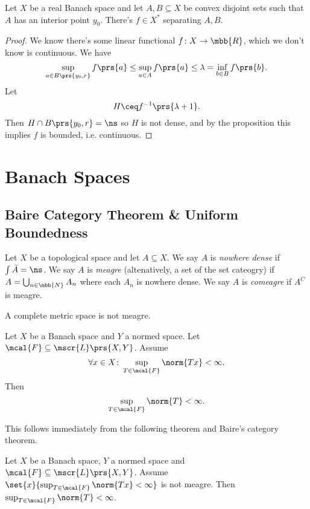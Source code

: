\documentclass[10pt, twoside]{book}
\begin{document}
\begin{corollary}
Let $X$ be a real Banach space and let $A,B \subseteq X$ be convex disjoint sets such that $A$ has an interior point $y_0$.
There's $f \in X^*$ separating $A,B$.
\end{corollary}

\begin{proof}
We know there's some linear functional $f \colon X \to \mbb{R}$, which we don't know is continuous.
We have
\[\sup_{a \in B\prs{y_0, r}} f\prs{a} \leq \sup_{a \in A} f\prs{a} \leq \lambda = \inf_{b \in B} f\prs{b} \text{.}\]
Let
\[H \ceq f^{-1}\prs{\lambda + 1} \text{.}\]
Then $H \cap B\prs{y_0, r} = \ns$ so $H$ is not dense, and by the proposition this implies $f$ is bounded, i.e. continuous.
\end{proof}

\section{Banach Spaces}

\subsection{Baire Category Theorem \& Uniform Boundedness}

\begin{definition}
Let $X$ be a topological space and let $A \subseteq X$.
We say $A$ is \emph{nowhere dense} if $\int \bar{A} = \ns$.
We say $A$ is \emph{meagre} (altenatively, a set of the set cateogry) if $A = \bigcup_{n \in \mbb{N}} A_n$ where each $A_n$ is nowhere dense.
We say $A$ is \emph{comeagre} if $A^C$ is meagre.
\end{definition}

\begin{theorem}[Baire]
A complete metric space is not meagre.
\end{theorem}

\begin{theorem}
Let $X$ be a Banach space and $Y$ a normed space. Let $\mcal{F} \subseteq \mscr{L}\prs{X,Y}$.
Assume
\[\forall x \in X \colon \sup_{T \in \mcal{F}} \norm{Tx} < \infty \text{.}\]
Then
\[\sup_{T \in \mcal{F}} \norm{T} < \infty \text{.}\]
\end{theorem}

This follows immediately from the following theorem and Baire's category theorem.

\begin{theorem}
Let $X$ be a Banach space, $Y$ a normed space and $\mcal{F} \subseteq \mscr{L}\prs{X,Y}$. Assume $\set{x}{\sup_{T \in \mcal{F}} \norm{T x} < \infty}$ is not meagre. Then $\sup_{T \in \mcal{F}} \norm{T} < \infty$.
\end{theorem}
\end{document}
